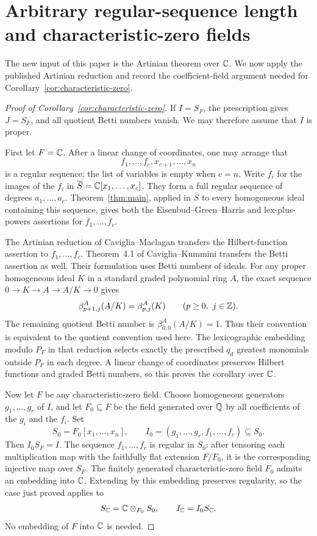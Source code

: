 \section{Arbitrary regular-sequence length and characteristic-zero fields}
\label{sec:characteristic-zero}

The new input of this paper is the Artinian theorem over \(\mathbb C\). We now
apply the published Artinian reduction and record the coefficient-field
argument needed for Corollary~\ref{cor:characteristic-zero}.

\begin{proof}[Proof of Corollary~\ref{cor:characteristic-zero}]
If \(I=S_F\), the prescription gives \(J=S_F\), and all quotient Betti
numbers vanish. We may therefore assume that \(I\) is proper.

First let \(F=\mathbb C\). After a linear change of coordinates, one may arrange
that
\[
 f_1,\ldots,f_c,x_{c+1},\ldots,x_n
\]
is a regular sequence; the list of variables is empty when \(c=n\).
Write \(\overline f_i\) for the images of the \(f_i\) in
\(\overline S=\mathbb C[x_1,\ldots,x_c]\). They form a full regular sequence
of degrees \(a_1,\ldots,a_c\). Theorem~\ref{thm:main}, applied in
\(\overline S\) to every homogeneous ideal containing this sequence,
gives both the Eisenbud--Green--Harris and lex-plus-powers assertions for
\(\overline f_1,\ldots,\overline f_c\).

The Artinian reduction of Caviglia--Maclagan
\cite[Proposition~10]{CM08} transfers the Hilbert-function assertion to
\(f_1,\ldots,f_c\). Theorem~4.1 of Caviglia--Kummini \cite{CK14}
transfers the Betti assertion as well. Their formulation uses Betti
numbers of ideals. For any proper homogeneous ideal \(K\) in a standard
graded polynomial ring \(A\), the exact sequence
\(0\to K\to A\to A/K\to0\) gives
\[
 \beta^A_{p+1,j}(A/K)=\beta^A_{p,j}(K)
 \qquad(p\ge0,\ j\in\mathbb Z).
\]
The remaining quotient Betti number is \(\beta^A_{0,0}(A/K)=1\).
Thus their convention is equivalent to the quotient convention used
here. The lexicographic embedding modulo \(P_F\) in that reduction
selects exactly the prescribed \(q_d\) greatest monomials outside \(P_F\)
in each degree. A linear change of coordinates preserves Hilbert functions
and graded Betti numbers, so this proves the corollary over \(\mathbb C\).

Now let \(F\) be any characteristic-zero field. Choose homogeneous
generators \(g_1,\ldots,g_r\) of \(I\), and let \(F_0\subseteq F\) be
the field generated over \(\mathbb Q\) by all coefficients of the \(g_i\) and
the \(f_i\). Set
\[
 S_0=F_0[x_1,\ldots,x_n],\qquad
 I_0=(g_1,\ldots,g_r,f_1,\ldots,f_c)\subseteq S_0.
\]
Then \(I_0S_F=I\). The sequence \(f_1,\ldots,f_c\) is regular in
\(S_0\): after tensoring each multiplication map with the faithfully
flat extension \(F/F_0\), it is the corresponding injective map over
\(S_F\). The finitely generated characteristic-zero field \(F_0\)
admits an embedding into \(\mathbb C\). Extending by this embedding preserves
regularity, so the case just proved applies to
\[
 S_{\mathbb C}=\mathbb C\otimes_{F_0}S_0,\qquad I_{\mathbb C}=I_0S_{\mathbb C}.
\]
No embedding of \(F\) into \(\mathbb C\) is needed.


\end{proof}
